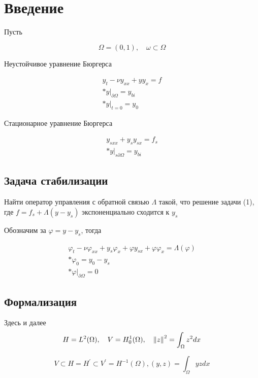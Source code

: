 \section{Введение}

Пусть

\begin{equation}
    \Omega = (0, 1), \quad \omega \subset \Omega
\end{equation}

Неустойчивое уравнение Бюргерса

\begin{gather}
    y_t - \nu y_{xx} + yy_x = f \\*
    y|_{\partial \Omega} = y_{bi} \\*
    y|_{t=0} = y_0
\end{gather}

Стационарное уравнение Бюргерса

\begin{gather}
    y_{sxx} + y_s y_{sx} = f_s \\*
    y|_{s \partial \Omega} = y_{bi}
\end{gather}

\subsection{Задача стабилизации}
Найти оператор управления с обратной связью $\Lambda$ такой, что решение задачи
(1), где $f = f_s + \Lambda (y - y_s)$ экспоненциально сходится к $y_s$

Обозначим за $\varphi = y - y_s$, тогда

\begin{gather}
    \varphi_t - \nu \varphi_{xx} + y_s \varphi_x + \varphi y_{sx} + \varphi
    \varphi_x = \Lambda(\varphi) \\*
    \varphi_0 = y_0 - y_s \\*
    \varphi|_{\partial \Omega} = 0
\end{gather}

\subsection{Формализация}
Здесь и далее
\begin{equation}
 H = L^2(\Omega), \quad V = H^1_0(\Omega), \quad \left\lVert z\right\rVert^2 = \int_{\Omega}{z^2dx}
\end{equation}

\begin{equation}
    V \subset H = H^{'} \subset V^{'} = H^{-1}(\Omega), (y, z) =
\int_{\Omega}{yzdx}
\end{equation}

